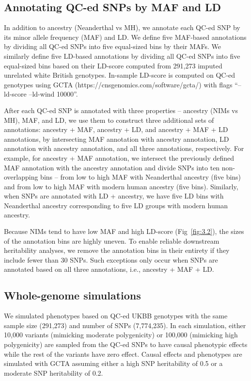 \subsection{Annotating QC-ed SNPs by MAF and LD}
\label{3.3.4}
In addition to ancestry (Neanderthal vs MH), we annotate each QC-ed SNP by its minor allele frequency (MAF) and LD. We define five MAF-based annotations by dividing all QC-ed SNPs into five equal-sized bins by their MAFs. We similarly define five LD-based annotations by dividing all QC-ed SNPs into five equal-sized bins based on their LD-score computed from 291,273 imputed unrelated white British genotypes. In-sample LD-score is computed on QC-ed genotypes using GCTA (https://cnsgenomics.com/software/gcta/)  with flags ``--ld-score --ld-wind 10000''.

After each QC-ed SNP is annotated with three properties -- ancestry (NIMs vs MH), MAF, and LD, we use them to construct three additional sets of annotations: ancestry + MAF, ancestry + LD, and ancestry + MAF + LD annotations, by intersecting MAF annotation with ancestry annotation, LD annotation with ancestry annotation, and all three annotations, respectively. For example, for ancestry + MAF annotation, we intersect the previously defined MAF annotation with the ancestry annotation and divide SNPs into ten non-overlapping bins -- from low to high MAF with Neanderthal ancestry (five bins) and from low to high MAF with modern human ancestry (five bins). Similarly, when SNPs are annotated with LD + ancestry, we have five LD bins with Neanderthal ancestry corresponding to five LD groups with modern human ancestry. 

Because NIMs tend to have low MAF and high LD-score (Fig~\ref{fig:3.2}), the sizes of the annotation bins are highly uneven. To enable reliable downstream heritability analyses, we remove the annotation bins in their entirety if they include fewer than 30 SNPs. Such exceptions only occur when SNPs are annotated based on all three annotations, i.e., ancestry + MAF + LD. 

\subsection{Whole-genome simulations}
\label{3.3.5}
We simulated phenotypes based on QC-ed UKBB genotypes with the same sample size (291,273) and number of SNPs (7,774,235). In each simulation, either 10,000 variants (mimicking moderate polygenicity) or 100,000 (mimicking high polygenicity) are sampled from the QC-ed SNPs to have causal phenotypic effects while the rest of the variants have zero effect. Causal effects and phenotypes are simulated with GCTA assuming either a high SNP heritability of 0.5 or a moderate SNP heritability of 0.2.

